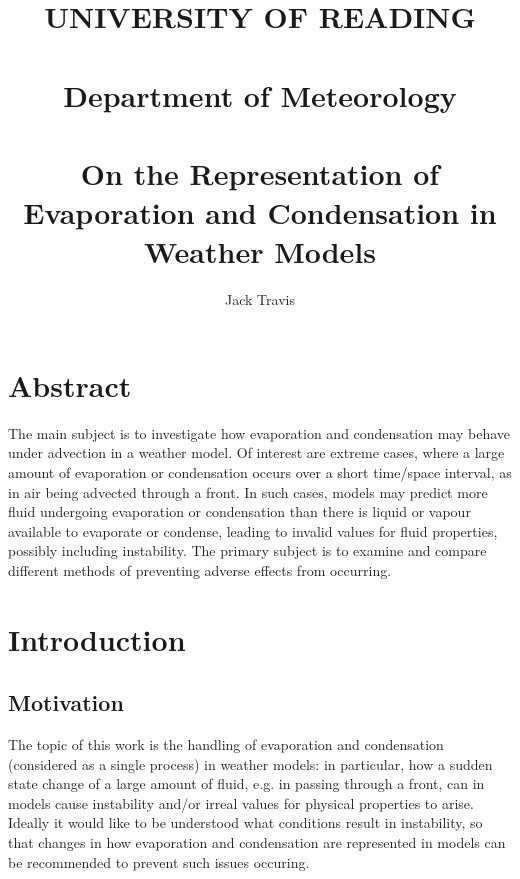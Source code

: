 \documentclass[11pt]{article}
\begin{document}
\thispagestyle{empty}
\title{UNIVERSITY OF READING\\
~\\
Department of Meteorology\\
~\\
On the Representation of Evaporation and Condensation in Weather Models}
\author{Jack Travis}
\maketitle


\section{Abstract}
The main subject is to investigate how evaporation and condensation may behave under advection in a weather model. Of interest are extreme cases, where a large amount of evaporation or condensation occurs over a short time/space interval, as in air being advected through a front. In such cases, models may predict more fluid undergoing evaporation or condensation than there is liquid or vapour available to evaporate or condense, leading to invalid values for fluid properties, possibly including instability. The primary subject is to examine and compare different methods of preventing adverse effects from occurring.

\newpage

\tableofcontents

\newpage

\section{Introduction}
\subsection{Motivation}
The topic of this work is the handling of evaporation and condensation (considered as a single process) in weather models: in particular, how a sudden state change of a large amount of fluid, e.g. in passing through a front, can in models cause instability and/or irreal values for physical properties to arise. \\
Ideally it would like to be understood what conditions result in instability, so that changes in how evaporation and condensation are represented in models can be recommended to prevent such issues occuring.
\end{document}
